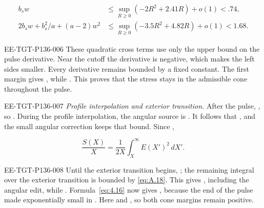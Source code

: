 \[
\begin{aligned}
 b_sw&\leq\sup_{R\geq0}(-2R^2+2.41R)+o(1)<.74,\\
 2b_sw+b_s^2/a+(a-2)w^2
   &\leq\sup_{R\geq0}(-3.5R^2+4.82R)+o(1)<1.68.
\end{aligned}
\]
\begin{EESegment}{EE-TGT-P136-006}
These quadratic cross terms use only the upper bound on the pulse derivative. Near the cutoff the derivative is negative,
which makes the left sides smaller. Every derivative remains bounded by a fixed constant. The first margin gives
, while . This proves that the stress stays in the
admissible cone throughout the pulse.
\end{EESegment}

\begin{EESegment}{EE-TGT-P136-007}
\emph{Profile interpolation and exterior transition.} After the pulse,
, so . During the profile interpolation, the angular source is
. It follows that , and the small
 angular correction keeps that bound. Since
,
\end{EESegment}
\begin{equation}
 \frac{S(X)}{X}=\frac1{2X}\int_X^\infty E(X')^2\,dX'.
 \tag{A.31}\label{eq:A.31}
\end{equation}
\begin{EESegment}{EE-TGT-P136-008}
Until the exterior transition begins, ; the remaining integral over the exterior
transition is bounded by \eqref{eq:A.18}. This gives
, including the angular edit, while
. Formula~\eqref{eq:4.16} now gives
, because the end of the pulse made
 exponentially small in . Here
 and , so both cone margins remain
positive.
\end{EESegment}

